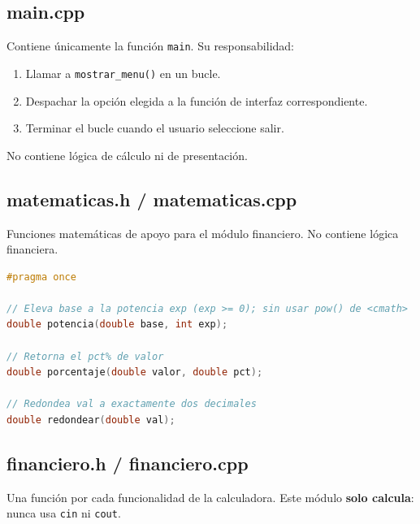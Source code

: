 \documentclass[12pt, oneside]{article}
\begin{document}
\subsection{main.cpp}

Contiene únicamente la función \texttt{main}.  Su responsabilidad:

\begin{enumerate}
  \item Llamar a \texttt{mostrar\_menu()} en un bucle.
  \item Despachar la opción elegida a la función de interfaz correspondiente.
  \item Terminar el bucle cuando el usuario seleccione salir.
\end{enumerate}

No contiene lógica de cálculo ni de presentación.

\subsection{matematicas.h / matematicas.cpp}

Funciones matemáticas de apoyo para el módulo financiero.
No contiene lógica financiera.

\begin{lstlisting}[style=firmas, language=C++]
#pragma once

// Eleva base a la potencia exp (exp >= 0); sin usar pow() de <cmath>
double potencia(double base, int exp);

// Retorna el pct% de valor
double porcentaje(double valor, double pct);

// Redondea val a exactamente dos decimales
double redondear(double val);
\end{lstlisting}

\subsection{financiero.h / financiero.cpp}

Una función por cada funcionalidad de la calculadora.
Este módulo \textbf{solo calcula}: nunca usa \texttt{cin} ni \texttt{cout}.
\end{document}
